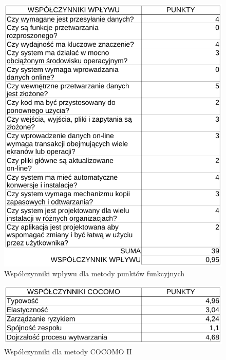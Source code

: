\documentclass{mwrep}
\begin{document}
\begin{figure}[!h]
    \centerline{\includegraphics*[scale=1]{punkty-funkcyjne-wsp-wplywu-crop.pdf}}
    \caption{Współczynniki wpływu dla metody punktów funkcyjnych}
\end{figure}

\begin{figure}[!h]
    \centerline{\includegraphics*[scale=1]{wsp-cocomo-crop.pdf}}
    \caption{Współczynniki dla metody COCOMO II}
\end{figure}
\end{document}
